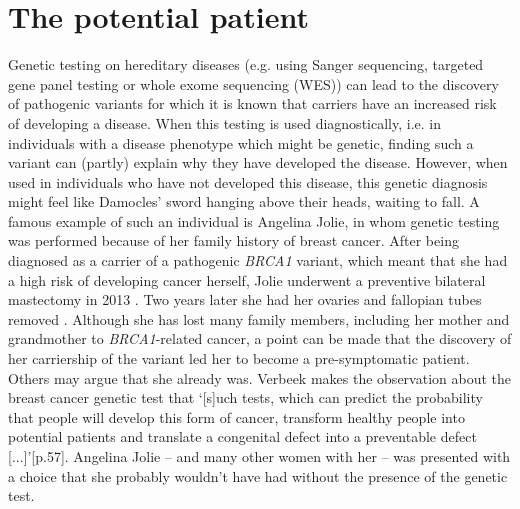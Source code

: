 \section{The potential patient}
Genetic testing on hereditary diseases (e.g. using Sanger sequencing, targeted gene panel testing or whole exome sequencing (WES)) can lead to the discovery of pathogenic variants for which it is known that carriers have an increased risk of developing a disease. 
When this testing is used diagnostically, i.e. in individuals with a disease phenotype which might be genetic, finding such a variant can (partly) explain why they have developed the disease. 
However, when used in individuals who have not developed this disease, this genetic diagnosis might feel like Damocles’ sword hanging above their heads, waiting to fall. 
A famous example of such an individual is Angelina Jolie, in whom genetic testing was performed because of her family history of breast cancer. 
After being diagnosed as a carrier of a pathogenic \textsl{BRCA1} variant, which meant that she had a high risk of developing cancer herself, Jolie underwent a preventive bilateral mastectomy in 2013 \cite{Nabi_2017}. 
Two years later she had her ovaries and fallopian tubes removed \cite{Vicari_2017}. 
Although she has lost many family members, including her mother and grandmother to \textsl{BRCA1}-related cancer, a point can be made that the discovery of her carriership of the variant led her to become a pre-symptomatic patient. 
Others may argue that she already was. 
Verbeek makes the observation about the breast cancer genetic test that ‘[s]uch tests, which can predict the probability that people will develop this form of cancer, transform healthy people into potential patients and translate a congenital defect into a preventable defect [...]’\cite{Verbeek_2011}[p.57]. 
Angelina Jolie – and many other women with her – was presented with a choice that she probably wouldn’t have had without the presence of the genetic test. 

